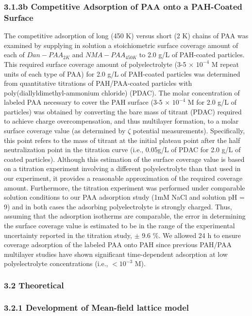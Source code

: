 \documentclass[journal=mamobx,manuscript=article]{achemso}
\begin{document}
\subsubsection{3.1.3b Competitive Adsorption of PAA onto a PAH-Coated Surface}

The competitive adsorption of long (450 K) versus short (2 K) chains of PAA was examined by supplying in solution a stoichiometric surface coverage amount of each of $Dan-PAA_{2K}$ and $NMA-PAA_{450K}$ to 2.0 g/L of PAH-coated particles.  This required surface coverage amount of polyelectrolyte (3-5 $\times$ $10^{-4}$ M repeat units of each type of PAA) for 2.0 g/L of PAH-coated particles was determined from quantitative titrations of PAH/PAA-coated particles with poly(diallyldimethyl-ammonium chloride) (PDAC).\cite{Burke2003}   The molar concentration of labeled PAA necessary to cover the PAH surface (3-5 $\times$ $10^{-4}$ M for 2.0 g/L of particles) was obtained by converting the bare mass of titrant (PDAC) required to achieve charge overcompensation, and thus multilayer formation, to a molar surface coverage value (as determined by $\zeta$ potential measurements).\cite{Burke2003}   Specifically, this point refers to the mass of titrant at the initial plateau point after the half neutralization point in the titration curve (i.e., 0.05g/L of PDAC for 2.0 g/L of coated particles).  Although this estimation of the surface coverage value is based on a titration experiment involving a different polyelectrolyte than that used in our experiment, it provides a reasonable approximation of the required coverage amount.  Furthermore, the titration experiment was performed under comparable solution conditions to our PAA adsorption study (1mM NaCl and solution pH = 9) and in both cases the adsorbing polyelectrolyte is strongly charged.  Thus, assuming that the adsorption isotherms are comparable, the error in determining the surface coverage value is estimated to be in the range of the experimental uncertainty reported in the titration study, $\pm$ 9.6 \%.  We allowed 24 h to ensure coverage adsorption of the labeled PAA onto PAH since previous PAH/PAA multilayer studies have shown significant time-dependent adsorption at low polyelectrolyte concentrations (i.e., $<10^{-3}$ M).\cite{Mermut2003}

\subsubsection{3.2 Theoretical}

\subsubsection{3.2.1 Development of Mean-field lattice model}
\end{document}
